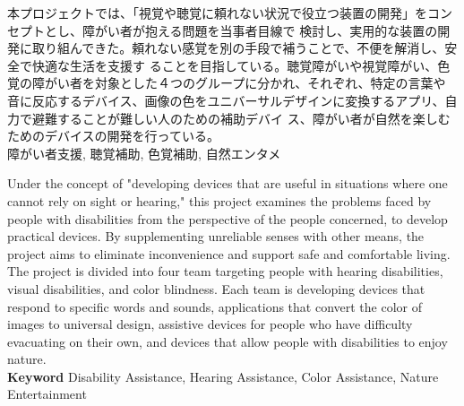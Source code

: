 \documentclass[11pt,a4paper]{report}
\begin{document}
{
    \centerline{
      \huge{}
    }
    \vspace{1cm}
    \noindent\space
    本プロジェクトでは、「視覚や聴覚に頼れない状況で役立つ装置の開発」をコンセプトとし、障がい者が抱える問題を当事者目線で
検討し、実用的な装置の開発に取り組んできた。頼れない感覚を別の手段で補うことで、不便を解消し、安全で快適な生活を支援す
ることを目指している。聴覚障がいや視覚障がい、色覚の障がい者を対象とした４つのグループに分かれ、それぞれ、特定の言葉や
音に反応するデバイス、画像の色をユニバーサルデザインに変換するアプリ、自力で避難することが難しい人のための補助デバイ
ス、障がい者が自然を楽しむためのデバイスの開発を行っている。\\

\noindent{} \indent 障がい者支援, 聴覚補助, 色覚補助, 自然エンタメ

}
\newpage
{
    \centerline{
      \textbf{\huge{}}
    }
    \vspace{1cm}
    \noindent\space
    Under the concept of "developing devices that are useful in situations where one cannot rely on sight or hearing," this project examines the
problems faced by people with disabilities from the perspective of the people concerned, to develop practical devices. By supplementing
unreliable senses with other means, the project aims to eliminate inconvenience and support safe and comfortable living. The project is
divided into four team targeting people with hearing disabilities, visual disabilities, and color blindness. Each team is developing devices that
respond to specific words and sounds, applications that convert the color of images to universal design, assistive devices for people who
have difficulty evacuating on their own, and devices that allow people with disabilities to enjoy nature.\\

\noindent\textbf{\textsf{Keyword}} \indent Disability Assistance, Hearing Assistance, Color Assistance, Nature Entertainment

}
\newpage

\tableofcontents %
\newpage

\pagestyle{fancy}
\fancyhead{} %

\end{document}
